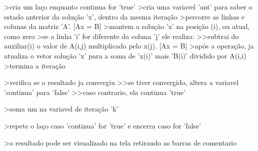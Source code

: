 \documentclass{article}
\begin{document}
                    >cria um laço enquanto continua for 'true'
                      >cria uma variavel 'ant' para saber o estado anterior da solução 'x', dentro da mesma iteração
                      >percorre as linhas e colunas da matriz 'A'. [Ax = B]
                      >mantem a solução 'x' na posição (i), ou atual, como zero
                      >se a linha 'i' for diferente da coluna 'j' ele realiza:
                        >>subtrai do auxiliar(i) o valor de A(i,j) multiplicado pelo x(j). [Ax = B]
                      >após a operação, ja atualiza o vetor solução 'x' para a soma de 'x(i)' mais 'B(i)' dividido por A(i,i)
                      >termina a iteração

                      >verifica se o resultado ja convergiu
                        >>se tiver convergido, altera a variavel 'continua' para 'false'
                        >>caso contrario, ela continua 'true'

                      >soma um na variavel de iteração 'k'

                      >repete o laço caso 'continua' for 'true' e encerra caso for 'false'

                    >o resultado pode ser visualizado na tela retirando as barras de comentario %
\end{document}
